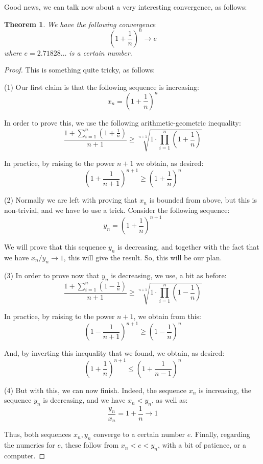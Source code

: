 \documentclass[12pt]{amsbook}
\newtheorem{theorem}{Theorem}[chapter]
\begin{document}
Good news, we can talk now about a very interesting convergence, as follows:


\begin{theorem}
We have the following convergence
$$\left(1+\frac{1}{n}\right)^n\to e$$
where $e=2.71828\ldots$ is a certain number.
\end{theorem}

\begin{proof}
This is something quite tricky, as follows:

\medskip

(1) Our first claim is that the following sequence is increasing:
$$x_n=\left(1+\frac{1}{n}\right)^n$$ 

In order to prove this, we use the following arithmetic-geometric inequality:
$$\frac{1+\sum_{i=1}^n\left(1+\frac{1}{n}\right)}{n+1}\geq\sqrt[n+1]{1\cdot\prod_{i=1}^n\left(1+\frac{1}{n}\right)}$$

In practice, by raising to the power $n+1$ we obtain, as desired:
$$\left(1+\frac{1}{n+1}\right)^{n+1}\geq\left(1+\frac{1}{n}\right)^n$$

(2) Normally we are left with proving that $x_n$ is bounded from above, but this is non-trivial, and we have to use a trick. Consider the following sequence:
$$y_n=\left(1+\frac{1}{n}\right)^{n+1}$$ 

We will prove that this sequence $y_n$ is decreasing, and together with the fact that we have $x_n/y_n\to1$, this will give the result. So, this will be our plan. 

\medskip

(3) In order to prove now that $y_n$ is decreasing, we use, a bit as before:
$$\frac{1+\sum_{i=1}^n\left(1-\frac{1}{n}\right)}{n+1}\geq\sqrt[n+1]{1\cdot\prod_{i=1}^n\left(1-\frac{1}{n}\right)}$$

In practice, by raising to the power $n+1$, we obtain from this:
$$\left(1-\frac{1}{n+1}\right)^{n+1}\geq\left(1-\frac{1}{n}\right)^n$$

And, by inverting this inequality that we found, we obtain, as desired:
$$\left(1+\frac{1}{n}\right)^{n+1}\leq\left(1+\frac{1}{n-1}\right)^n$$

(4) But with this, we can now finish. Indeed, the sequence $x_n$ is increasing, the sequence $y_n$ is decreasing, and we have $x_n<y_n$, as well as:
$$\frac{y_n}{x_n}=1+\frac{1}{n}\to1$$

Thus, both sequences $x_n,y_n$ converge to a certain number $e$. Finally, regarding the numerics for $e$, these follow from $x_n<e<y_n$, with a bit of patience, or a computer.
\end{proof}
\end{document}
